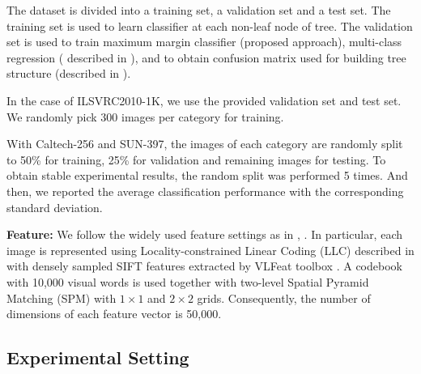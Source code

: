 \documentclass[review]{elsarticle}
\begin{document}
The dataset is divided into a training set, a validation set and a test set. 
The training set is used to learn classifier at each non-leaf node of tree. 
The validation set is used to train maximum margin classifier (proposed approach), multi-class regression ( described in \cite{Zhu.CVIU2014}), and to obtain confusion matrix used for building tree structure (described in \cite{Bengio.NIPS2010}). 
 
In the case of ILSVRC2010-1K, we use the provided validation set and test set. We randomly pick 300 images per category for training. 

With Caltech-256 and SUN-397, the images of each category are randomly split to 50\% for training, 25\% for validation and remaining images for testing. 
To obtain stable experimental results, the random split was performed 5 times. And then, we reported the average classification performance with the corresponding standard deviation. 
 
\textbf{Feature:} We follow the widely used feature settings as in \cite{Deng.NIPS2011}, \cite{Liu.CVPR2013.ProbTree}. In particular, each image is represented using Locality-constrained Linear Coding (LLC) described in \cite{Wang.CVPR2010} with densely sampled SIFT features extracted by VLFeat toolbox \cite{Vedaldi10vlfeat}. A codebook with 10,000 visual words is used together with two-level Spatial Pyramid Matching (SPM) \cite{Lazebnik.CVPR2006} with $1 \times 1$ and $2 \times 2$ grids. Consequently, the number of dimensions of each feature vector is 50,000.


\subsection{Experimental Setting} 
\end{document}
